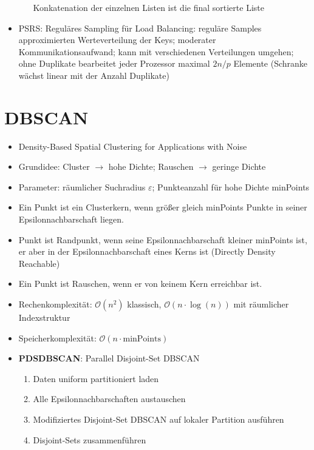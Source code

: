 \documentclass[11pt]{scrartcl}
\begin{document}
\begin{itemize}
\begin{enumerate}
        Konkatenation der einzelnen Listen ist die final sortierte Liste
    \end{enumerate}
    \item PSRS: Reguläres Sampling für Load Balancing: reguläre Samples approximierten 
    Werteverteilung der Keys; moderater Kommunikationsaufwand; kann mit verschiedenen 
    Verteilungen umgehen; ohne Duplikate bearbeitet jeder Prozessor maximal $2n/p$ Elemente 
    (Schranke wächst linear mit der Anzahl Duplikate)
\end{itemize}

\section{DBSCAN}

\begin{itemize}
    \item Density-Based Spatial Clustering for Applications with Noise
    \item Grundidee: Cluster $\rightarrow$ hohe Dichte; Rauschen $\rightarrow$ geringe Dichte
    \item Parameter: räumlicher Suchradius $\varepsilon$; Punkteanzahl für hohe Dichte minPoints
    \item Ein Punkt ist ein Clusterkern, wenn größer gleich minPoints Punkte in seiner 
    Epsilonnachbarschaft liegen.
    \item Punkt ist Randpunkt, wenn seine Epsilonnachbarschaft kleiner minPoints ist, 
    er aber in der Epsilonnachbarschaft eines Kerns ist (Directly Density Reachable)
    \item Ein Punkt ist Rauschen, wenn er von keinem Kern erreichbar ist.
    \item Rechenkomplexität: $\mathcal{O}(n^2)$ klassisch, $\mathcal{O}(n \cdot \log(n))$ mit räumlicher Indexstruktur
    \item Speicherkomplexität: $\mathcal{O}(n \cdot \textrm{minPoints})$
    \item \textbf{PDSDBSCAN}: Parallel Disjoint-Set DBSCAN
    \begin{enumerate}
        \item Daten uniform partitioniert laden
        \item Alle Epsilonnachbarschaften austauschen
        \item Modifiziertes Disjoint-Set DBSCAN auf lokaler Partition ausführen
        \item Disjoint-Sets zusammenführen
    \end{enumerate}

\end{itemize}
\end{document}
